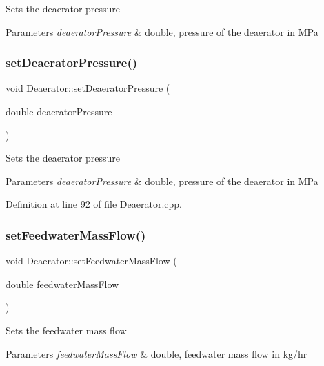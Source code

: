 Sets the deaerator pressure 
\begin{DoxyParams}{Parameters}
{\em deaerator\+Pressure} & double, pressure of the deaerator in M\+Pa \\
\hline
\end{DoxyParams}
\mbox{\label{class_deaerator_a5b20d3aba98b21928cce70b45e843ff3}} 
\subsubsection{\texorpdfstring{set\+Deaerator\+Pressure()}{setDeaeratorPressure()}\hspace{0.1cm}{\footnotesize\ttfamily [3/3]}}
{\footnotesize\ttfamily void Deaerator\+::set\+Deaerator\+Pressure (\begin{DoxyParamCaption}\item[{double}]{deaerator\+Pressure }\end{DoxyParamCaption})}

Sets the deaerator pressure 
\begin{DoxyParams}{Parameters}
{\em deaerator\+Pressure} & double, pressure of the deaerator in M\+Pa \\
\hline
\end{DoxyParams}


Definition at line 92 of file Deaerator.\+cpp.

\mbox{\label{class_deaerator_ada95cb2557bc43602d7bcefbad66c853}} 
\subsubsection{\texorpdfstring{set\+Feedwater\+Mass\+Flow()}{setFeedwaterMassFlow()}\hspace{0.1cm}{\footnotesize\ttfamily [1/3]}}
{\footnotesize\ttfamily void Deaerator\+::set\+Feedwater\+Mass\+Flow (\begin{DoxyParamCaption}\item[{double}]{feedwater\+Mass\+Flow }\end{DoxyParamCaption})}

Sets the feedwater mass flow 
\begin{DoxyParams}{Parameters}
{\em feedwater\+Mass\+Flow} & double, feedwater mass flow in kg/hr \\
\hline
\end{DoxyParams}


